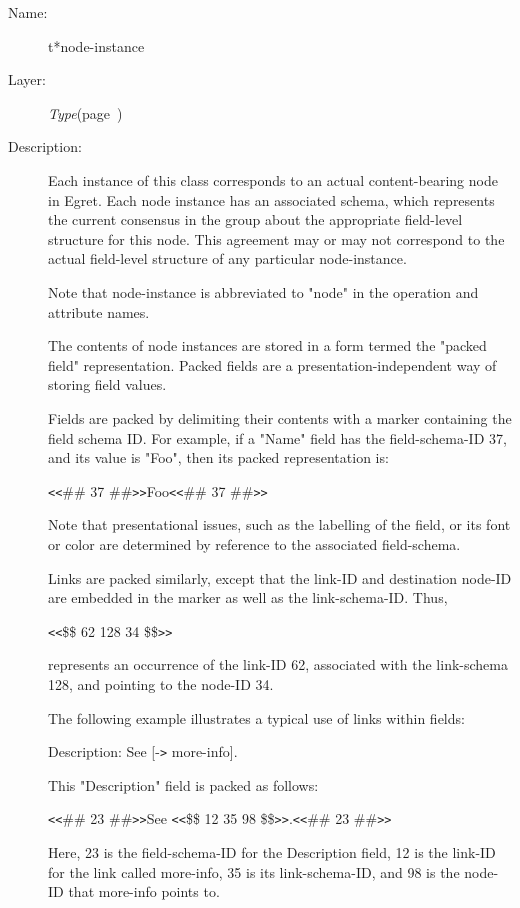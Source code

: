 \begin{description}
\item [Name:]  t*node-instance

\item [Layer:] {\sl Type}\hfill(page~\pageref{Type})

\item [Description:]

Each instance of this class corresponds to an actual
content-bearing node in Egret.  Each node instance has
an associated schema, which represents the current
consensus in the group about the appropriate field-level
structure for this node.  This agreement may or may not
correspond to the actual field-level structure of any
particular node-instance.

Note that node-instance is abbreviated to "node" in
the operation and attribute names. 

The contents of node instances are stored in a form
termed the "packed field" representation. Packed fields
are a presentation-independent way of storing field
values. 

Fields are packed by delimiting their contents with a
marker containing the field schema ID. For example, if a
"Name" field has the field-schema-ID 37, and its value
is "Foo", then its packed representation is:

{\tt<}{\tt<}\#\# 37 \#\#{\tt>}{\tt>}Foo{\tt<}{\tt<}\#\# 37 \#\#{\tt>}{\tt>}

Note that presentational issues, such as the labelling
of the field, or its font or color are determined by
reference to the associated field-schema.

Links are packed similarly, except that the link-ID
and destination node-ID are embedded in the marker as
well as the link-schema-ID. Thus,

{\tt<}{\tt<}\$\$ 62 128 34 \$\${\tt>}{\tt>} 

represents an occurrence of the link-ID 62, associated
with the link-schema 128, and pointing to the node-ID
34.  

The following example illustrates a typical use of links
within fields:

Description: See [-{\tt>} more-info]. 

This "Description" field is packed as follows:

{\tt<}{\tt<}\#\# 23 \#\#{\tt>}{\tt>}See {\tt<}{\tt<}\$\$ 12 35 98 \$\${\tt>}{\tt>}.{\tt<}{\tt<}\#\# 23 \#\#{\tt>}{\tt>}

Here, 23 is the field-schema-ID for the Description
field, 12 is the link-ID for the link called more-info,
35 is its link-schema-ID, and 98 is the node-ID that
more-info points to.



\end{description}
